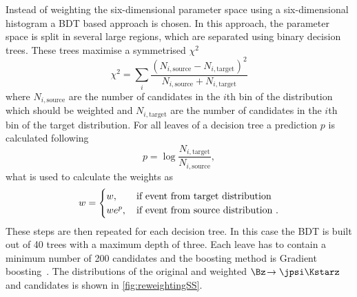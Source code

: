 Instead of weighting the six-dimensional parameter space using a six-dimensional histogram a BDT based approach is chosen.
In this approach, the parameter space is split in several large regions, which are separated using binary decision trees.
These trees maximise a symmetrised $\chi^2$
\begin{equation}
\chi^2=\sum_{i}\frac{\left(N_{i,\text{source}}-N_{i,\text{target}}\right)^2}{N_{i,\text{source}}+N_{i,\text{target}}}
\end{equation}
where $N_{i,\text{source}}$ are the number of candidates in the $i$th bin of the distribution which should be weighted and $N_{i,\text{target}}$ are the number of candidates in the $i$th bin of the target distribution.
For all leaves of a decision tree a prediction $p$ is calculated following
\begin{equation}
p=\log\frac{N_{i,\text{target}}}{N_{i,\text{source}}},
\end{equation}
what is used to calculate the weights as
\begin{equation}
w=\begin{cases} w, &\, \text{if event from target distribution}\\ we^{p}, &\, \text{if event from source distribution\,\,.} \end{cases}
\end{equation}
These steps are then repeated for each decision tree.
In this case the BDT is built out of \num{40} trees with a maximum depth of three.
Each leave has to contain a minimum number of \num{200} candidates and the boosting method is Gradient boosting~\cite{Friedman00greedyfunction}.
The distributions of the original and weighted $\Bz\!\to\jpsi\Kstarz$ and \BdToDpi candidates is shown in \cref{fig:reweightingSS}.
